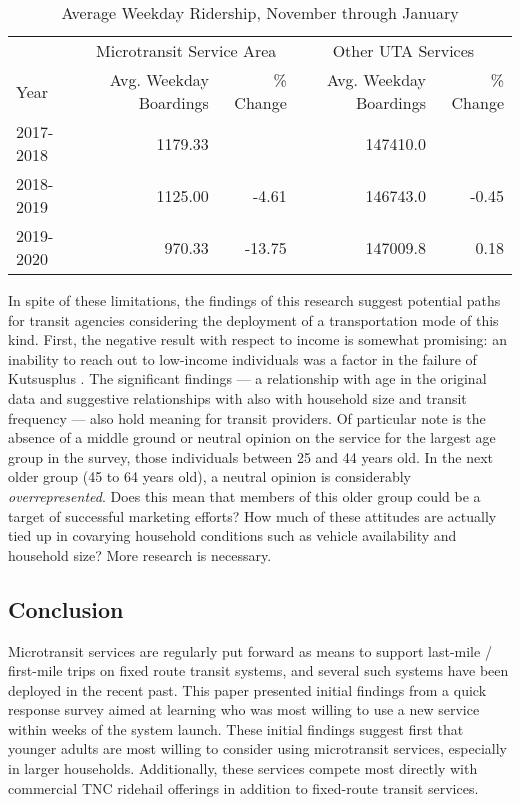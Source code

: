 \documentclass[smartcities,article,submit,moreauthors,pdftex]{Definitions/mdpi}
\begin{document}
\begin{table}[ht]
    \centering
    \caption{Average Weekday Ridership, November through January}
    \label{tab:uta-ridership}
    \begin{tabular}[t]{lrrrr}
\toprule
\multicolumn{1}{c}{ } & \multicolumn{2}{c}{Microtransit Service Area} & \multicolumn{2}{c}{Other UTA Services} \\
\cmidrule(l{3pt}r{3pt}){2-3} \cmidrule(l{3pt}r{3pt}){4-5}
Year & Avg. Weekday Boardings & \% Change & Avg. Weekday Boardings & \% Change\\
\midrule
2017-2018 & 1179.33 &  & 147410.0 & \\
2018-2019 & 1125.00 & -4.61 & 146743.0 & -0.45\\
2019-2020 & 970.33 & -13.75 & 147009.8 & 0.18\\
\bottomrule
\end{tabular}
\end{table}


In spite of these limitations, the findings of this research suggest potential paths for transit agencies considering the deployment of a transportation mode of this kind. First, the negative result with respect to income is somewhat promising: an inability to reach out to low-income individuals was a factor in the failure of Kutsusplus \citep{weckstrom2018}. The significant findings --- a relationship with age in the original data and suggestive relationships with also with household size and transit frequency --- also hold meaning for transit providers. Of particular note is the absence of a middle ground or neutral opinion on the service for the largest age group in the survey, those individuals between 25 and 44 years old. In the next older group (45 to 64 years old), a neutral opinion is considerably \emph{overrepresented}. Does this mean that members of this older group could be a target of successful marketing efforts? How much of these attitudes are actually tied up in covarying household conditions such as vehicle availability and household size? More research is necessary.

\subsection{Conclusion}

Microtransit services are regularly put forward as means to support last-mile / first-mile trips on fixed route transit systems, and several such systems have been deployed in the recent past. This paper presented initial findings from a quick response survey aimed at learning who was most willing to use a new service within weeks of the system launch. These initial findings suggest first that younger adults are most willing to consider using microtransit services, especially in larger households. Additionally, these services compete most directly with commercial TNC ridehail offerings in addition to fixed-route transit services.
\end{document}

